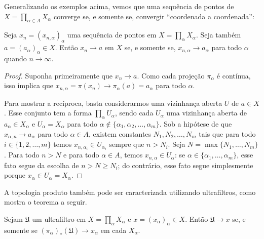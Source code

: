  Generalizando os exemplos acima,
 vemos que uma sequência de pontos de
 $X = \displaystyle{ \prod_{\alpha \in A} X_{\alpha} }$
 converge se, e somente se, convergir ``coordenada a coordenada'':
 
 \begin{theorem}
 \label{teo:4.1}
 Seja 
 $x_n = (x_{n, \alpha})_{\alpha}$
 uma sequência de pontos em 
 $X = \displaystyle{ \prod_{\alpha} X_{\alpha}}$.
 Seja também 
 $a = (a_{\alpha})_{\alpha} \in X$.
 Então
 $x_n \to a$
 em $X$ se, e somente se,
 $x_{n, \alpha} \to a_{\alpha}$
 para todo $\alpha$ quando $n \to \infty$.
 \end{theorem}
 
 \begin{proof}
 Suponha primeiramente que 
 $x_n \to a$.
 Como cada projeção
 $\pi_{\alpha}$
 é contínua, isso implica que
 $x_{n, \alpha} = \pi(x_n) \to \pi_{\alpha}(a) = a_{\alpha}$
 para todo $\alpha$.
 
 Para mostrar a recíproca, basta considerarmos uma vizinhança aberta
 $U$
 de 
 $a \in X$.
 Esse conjunto tem a forma
 $\displaystyle{ \prod_{\alpha} U_{\alpha} }$,
 sendo cada
 $U_{\alpha}$
 uma vizinhança aberta de
 $a_{\alpha} \in X_{\alpha}$
 e
 $U_{\alpha} = X_{\alpha}$
 para todo 
 $\alpha \notin \{ \alpha_1, \alpha_2, \dots, \alpha_m \}$.
 Sob a hipótese de que
 $x_{\alpha, n} \to a_{\alpha}$
 para todo
 $\alpha \in A$,
 existem constantes
 $N_1, N_2, \dots, N_m$
 tais que para todo
 $i \in \{ 1, 2, \dots, m \}$
 temos
 $x_{n, \alpha_i} \in U_{\alpha_i}$
 sempre que
 $n > N_i$.
 Seja
 $N = \max\{ N_1, \dots, N_m \}$.
 Para todo
 $n > N$
 e para todo
 $\alpha \in A$,
 temos
 $x_{n, \alpha} \in U_{\alpha}$:
 se
 $\alpha \in \{ \alpha_1, \dots, \alpha_m \}$,
 esse fato segue da escolha de 
 $n > N \geq N_i$;
 do contrário, esse fato segue simplesmente porque
 $x_{\alpha} \in U_{\alpha} = X_{\alpha}$.
 \end{proof}
 
 A topologia produto também pode ser caracterizada 
 utilizando ultrafiltros, como mostra o teorema a seguir.
 
 \begin{theorem}
 \label{teo:4.2}
 Sejam
 $\mathfrak{U}$
 um ultrafiltro em
 $X = \displaystyle{ \prod_{\alpha} X_{\alpha}}$
 e
 $x = (x_{\alpha})_{\alpha} \in X$.
 Então
 $\mathfrak{U} \to x$
 se, e somente se
 $(\pi_{\alpha})_{*}(\mathfrak{U}) \to x_{\alpha}$
 em cada $X_{\alpha}$.
 \end{theorem}
 
